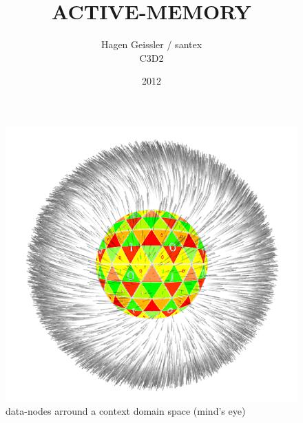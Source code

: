 \documentclass[15pt]{article}
\begin{document}
\vskip 1cm

\begin{figure}[htp]
\includegraphics[scale=0.70]{./img/artee-1.png}
\caption{data-nodes arround a context domain space (mind's eye)}

\end{figure}


\title{\textbf{ACTIVE-MEMORY}}
\author{Hagen Geissler / santex\\
		C3D2}
\date{2012}


\maketitle



\end{document}
